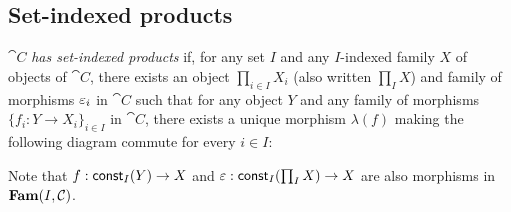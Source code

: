 \subsection{Set-indexed products}
\label{sec:set-indexed-product}

$\cat{C}$ \emph{has set-indexed products} if, for any set $I$ and any $I$-indexed family $X$ of objects of
$\cat{C}$, there exists an object $\prod_{i \in I}X_i$ (also written $\prod_{I} X$) and family of morphisms
$\varepsilon_i$ in $\cat{C}$ such that for any object $Y$ and any family of morphisms $\{f_i: Y \to X_i\}_{i \in I}$
in $\cat{C}$, there exists a unique morphism $\lambda(f)$ making the following diagram commute for every $i
\in I$:

\begin{center}
\end{center}

Note that $f: \mathsf{const}_{I}(Y) \to X$ and $\varepsilon: \mathsf{const}_{I}(\prod_{I} X) \to X$ are also morphisms in $\mathbf{Fam}(I,\mathcal{C})$.
